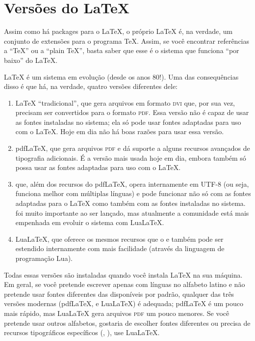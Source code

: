 \section{Versões do \LaTeX{}}
\label{sec:versions}

Assim como há packages para o \LaTeX{}, o próprio \LaTeX{} é, na verdade, um
conjunto de extensões para o programa \TeX{}. Assim, se você encontrar
referências a ``\TeX{}'' ou a ``plain \TeX{}'', basta saber que esse é o
sistema que funciona ``por baixo'' do \LaTeX{}.

\LaTeX{} é um sistema em evolução (desde os anos 80!). Uma das consequências
disso é que há, na verdade, quatro versões diferentes dele:

\begin{enumerate}
\item \LaTeX{} ``tradicional'', que gera arquivos em formato \textsc{dvi}
que, por sua vez, precisam ser convertidos para o formato \textsc{pdf}.
Essa versão não é capaz de usar as fontes instaladas no sistema; ela só
pode usar fontes adaptadas para uso com o \LaTeX{}. Hoje em dia não há
boas razões para usar essa versão.

\item pdf\LaTeX{}, que gera arquivos \textsc{pdf} e dá suporte a alguns
recursos avançados de tipografia adicionais. É a versão mais usada hoje
em dia, embora também só possa usar as fontes adaptadas para uso com o
\LaTeX{}.

\item \XeLaTeX{} que, além dos recursos do pdf\LaTeX{}, opera internamente
em UTF-8 (ou seja, funciona melhor com múltiplas línguas) e pode funcionar
não só com as fontes adaptadas para o \LaTeX{} como também com as fontes
instaladas no sistema. \XeLaTeX{} foi muito importante ao ser lançado,
mas atualmente a comunidade está mais empenhada em evoluir o sistema com
Lua\LaTeX{}.

\item Lua\LaTeX{}, que oferece os mesmos recursos que o \XeLaTeX{} e
também pode ser estendido internamente com mais facilidade (através da
linguagem de programação Lua).
\end{enumerate}

Todas essas versões são instaladas quando você instala \LaTeX{} na
sua máquina. Em geral, se você pretende escrever apenas com línguas no
alfabeto latino e não pretende usar fontes diferentes das disponíveis
por padrão, qualquer das três versões modernas (pdf\LaTeX{},
\XeLaTeX{} e Lua\LaTeX{}) é adequada; pdf\LaTeX{} é um pouco mais
rápido, mas Lua\LaTeX{} gera arquivos \textsc{pdf} um pouco menores.
Se você pretende usar outros alfabetos, gostaria de escolher
fontes diferentes ou precisa de recursos tipográficos específicos
(, ), use Lua\LaTeX{}.

